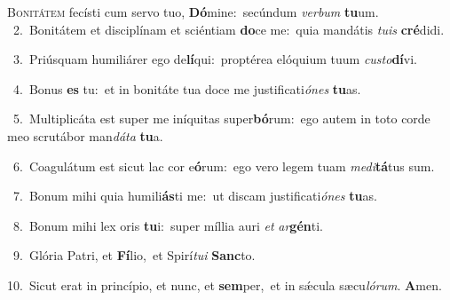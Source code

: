 \lettrine{\initial\textcolor{\initialcolor}{B}}{onitátem} fecísti cum servo tuo, \textbf{Dó}\-mine:~\star secúndum \textit{ver}\-\textit{bum} \textbf{tu}\-um.\\
{\numbfont\textcolor{\numbcolor}{~2.}}~Bonitátem et disciplínam et sciéntiam \textbf{do}\-ce me:~\star quia mandátis \textit{tu}\-\textit{is} \textbf{cré}\-didi.\par
{\numbfont\textcolor{\numbcolor}{~3.}}~Priúsquam humiliárer ego de\-\textbf{lí}\-qui:~\star proptérea elóquium tuum \textit{cus}\-\textit{to}\textbf{dí}vi.\par
{\numbfont\textcolor{\numbcolor}{~4.}}~Bonus \textbf{es} tu:~\star et in bonitáte tua doce me justificati\-\textit{ó}\-\textit{nes} \textbf{tu}\-as.\par
{\numbfont\textcolor{\numbcolor}{~5.}}~Multiplicáta est super me iníquitas super\-\textbf{bó}\-rum:~\star ego autem in toto corde meo scrutábor man\-\textit{dá}\-\textit{ta} \textbf{tu}\-a.\par
{\numbfont\textcolor{\numbcolor}{~6.}}~Coagulátum est sicut lac cor e\-\textbf{ó}\-rum:~\star ego vero legem tuam \textit{me}\-\textit{di}\textbf{tá}tus sum.\par
{\numbfont\textcolor{\numbcolor}{~7.}}~Bonum mihi quia humili\-\textbf{ás}\-ti me:~\star ut discam justificati\-\textit{ó}\-\textit{nes} \textbf{tu}\-as.\par
{\numbfont\textcolor{\numbcolor}{~8.}}~Bonum mihi lex oris \textbf{tu}\-i:~\star super míllia auri \textit{et} \textit{ar}\-\textbf{gén}ti.\par
{\numbfont\textcolor{\numbcolor}{~9.}}~Glória Patri, et \textbf{Fí}\-lio,~\star et Spirí\-\textit{tu}\-\textit{i} \textbf{Sanc}\-to.\par
{\numbfont\textcolor{\numbcolor}{10.}}~Sicut erat in princípio, et nunc, et \textbf{sem}\-per,~\star et in sǽcula sæcu\-\textit{ló}\-\textit{rum}. \textbf{A}\-men.\par
